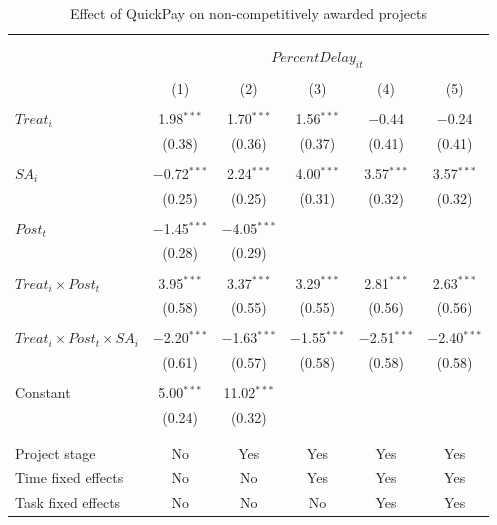 \documentclass[
]{article}
\begin{document}
\begin{table}[H] \centering 
  \caption{Effect of QuickPay on non-competitively awarded projects} 
  \label{} 
\small 
\begin{tabular}{@{\extracolsep{-2pt}}lccccc} 
\\[-1.8ex]\hline 
\hline \\[-1.8ex] 
\\[-1.8ex] & \multicolumn{5}{c}{$PercentDelay_{it}$  } \\ 
\\[-1.8ex] & (1) & (2) & (3) & (4) & (5)\\ 
\hline \\[-1.8ex] 
 $Treat_i$ & 1.98$^{***}$ & 1.70$^{***}$ & 1.56$^{***}$ & $-$0.44 & $-$0.24 \\ 
  & (0.38) & (0.36) & (0.37) & (0.41) & (0.41) \\ 
  & & & & & \\ 
 $SA_i$ & $-$0.72$^{***}$ & 2.24$^{***}$ & 4.00$^{***}$ & 3.57$^{***}$ & 3.57$^{***}$ \\ 
  & (0.25) & (0.25) & (0.31) & (0.32) & (0.32) \\ 
  & & & & & \\ 
 $Post_t$ & $-$1.45$^{***}$ & $-$4.05$^{***}$ &  &  &  \\ 
  & (0.28) & (0.29) &  &  &  \\ 
  & & & & & \\ 
 $Treat_i \times Post_t$ & 3.95$^{***}$ & 3.37$^{***}$ & 3.29$^{***}$ & 2.81$^{***}$ & 2.63$^{***}$ \\ 
  & (0.58) & (0.55) & (0.55) & (0.56) & (0.56) \\ 
  & & & & & \\ 
 $Treat_i \times Post_t \times SA_i $ & $-$2.20$^{***}$ & $-$1.63$^{***}$ & $-$1.55$^{***}$ & $-$2.51$^{***}$ & $-$2.40$^{***}$ \\ 
  & (0.61) & (0.57) & (0.58) & (0.58) & (0.58) \\ 
  & & & & & \\ 
 Constant & 5.00$^{***}$ & 11.02$^{***}$ &  &  &  \\ 
  & (0.24) & (0.32) &  &  &  \\ 
  & & & & & \\ 
\hline \\[-1.8ex] 
Project stage & No & Yes & Yes & Yes & Yes \\ 
Time fixed effects & No & No & Yes & Yes & Yes \\ 
Task fixed effects & No & No & No & Yes & Yes \\ 

\end{tabular}
\end{table}
\end{document}
